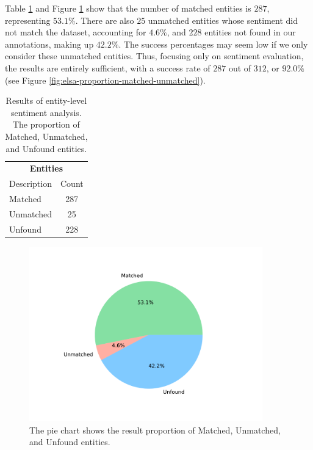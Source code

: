 Table \ref{table:elsa-proportion-matched-unmatched-unfound} and Figure \ref{fig:elsa-proportion-matched-unmatched-unfound} show that the number of matched entities is $287$, representing $53.1\%$. There are also $25$ unmatched entities whose sentiment did not match the dataset, accounting for $4.6\%$, and $228$ entities not found in our annotations, making up $42.2\%$. The success percentages may seem low if we only consider these unmatched entities. Thus, focusing only on sentiment evaluation, the results are entirely sufficient, with a success rate of $287$ out of $312$, or $92.0\%$ (see Figure \ref{fig:elsa-proportion-matched-unmatched}).

\begin{table}[ht]
    \centering
    \caption{Results of entity-level sentiment analysis. The proportion of Matched, Unmatched, and Unfound entities.}
    \label{table:elsa-proportion-matched-unmatched-unfound}
    \begin{tabular}{l c}
        \hline
        \multicolumn{2}{c}{\textbf{Entities}} \\
        \cline{1-2}
        Description & Count \\
        \hline
        Matched & 287 \\
        Unmatched & 25 \\
        Unfound & 228 \\
        \hline
    \end{tabular}
\end{table}

\begin{figure}[htpb]
    \centering
    \includegraphics[width=0.9\textwidth]{img/elsa/proportion_matched_unmatched_unfound-a.pdf}
    \caption{The pie chart shows the result proportion of Matched, Unmatched, and Unfound entities.}
    \label{fig:elsa-proportion-matched-unmatched-unfound}
\end{figure}

